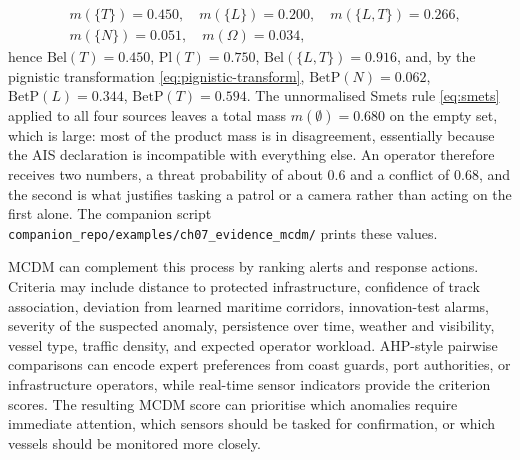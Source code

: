 \documentclass[graybox,envcountchap]{style/SNmono}
\newcommand{\repopath}[1]{\texttt{#1}}
\begin{document}
\begin{example}
\begin{equation}
\begin{aligned}
&m(\{T\})=0.450,\quad m(\{L\})=0.200,\quad m(\{L,T\})=0.266,\\
&m(\{N\})=0.051,\quad m(\Omega)=0.034,
\end{aligned}
\end{equation}
hence $\mathrm{Bel}(T)=0.450$, $\mathrm{Pl}(T)=0.750$, $\mathrm{Bel}(\{L,T\})=0.916$, and, by the pignistic transformation \eqref{eq:pignistic-transform}, $\mathrm{BetP}(N)=0.062$, $\mathrm{BetP}(L)=0.344$, $\mathrm{BetP}(T)=0.594$. The unnormalised Smets rule \eqref{eq:smets} applied to all four sources leaves a total mass $m(\emptyset)=0.680$ on the empty set, which is large: most of the product mass is in disagreement, essentially because the AIS declaration is incompatible with everything else. An operator therefore receives two numbers, a threat probability of about $0.6$ and a conflict of $0.68$, and the second is what justifies tasking a patrol or a camera rather than acting on the first alone. The companion script \repopath{companion\_\allowbreak repo/\allowbreak examples/\allowbreak ch07\_\allowbreak evidence\_\allowbreak mcdm/\allowbreak } prints these values.
\end{example}


MCDM can complement this process by ranking alerts and response actions. Criteria may include distance to protected infrastructure, confidence of track association, deviation from learned maritime corridors, innovation-test alarms, severity of the suspected anomaly, persistence over time, weather and visibility, vessel type, traffic density, and expected operator workload. AHP-style pairwise comparisons can encode expert preferences from coast guards, port authorities, or infrastructure operators, while real-time sensor indicators provide the criterion scores. The resulting MCDM score can prioritise which anomalies require immediate attention, which sensors should be tasked for confirmation, or which vessels should be monitored more closely.
\end{document}
